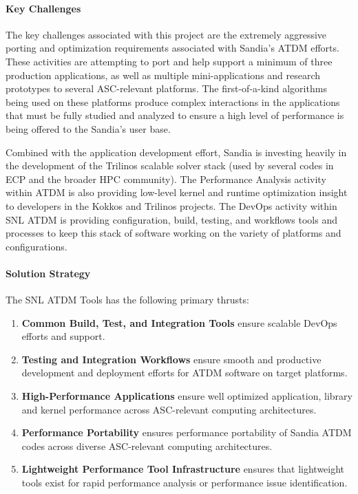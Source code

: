 \paragraph{Key Challenges}

The key challenges associated with this project are the extremely aggressive porting and optimization requirements associated with Sandia's ATDM efforts.
These activities are attempting to port and help support a minimum of three production applications, as well as multiple mini-applications and research prototypes to several ASC-relevant platforms.
The first-of-a-kind algorithms being used on these platforms produce complex interactions in the applications that must be fully studied and analyzed to ensure a high level of performance is being offered to the Sandia's user base.

Combined with the application development effort, Sandia is investing heavily in the development of the Trilinos scalable solver stack (used by several codes in ECP and the broader HPC community).
The Performance Analysis activity within ATDM is also providing low-level kernel and runtime optimization insight to developers in the Kokkos and Trilinos projects.
The DevOps activity within SNL ATDM is providing configuration, build, testing, and workflows tools and processes to keep this stack of software working on the variety of platforms and configurations.

\paragraph{Solution Strategy}

The SNL ATDM Tools has the following primary thrusts:

\begin{enumerate}

\item \textbf{Common Build, Test, and Integration Tools} ensure scalable DevOps efforts and support.

\item \textbf{Testing and Integration Workflows} ensure smooth and productive development and deployment efforts for ATDM software on target platforms.

\item \textbf{High-Performance Applications} ensure well optimized application, library and kernel performance across ASC-relevant computing architectures.

\item \textbf{Performance Portability} ensures performance portability of Sandia ATDM codes across diverse ASC-relevant computing architectures.

\item \textbf{Lightweight Performance Tool Infrastructure} ensures that lightweight tools exist for rapid performance analysis or performance issue identification.

\end{enumerate}

